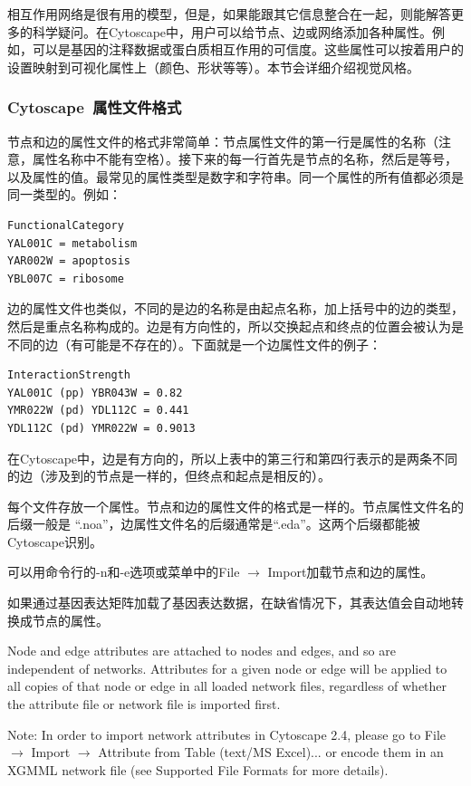 相互作用网络是很有用的模型，但是，如果能跟其它信息整合在一起，则能解答更多的科学疑问。在Cytoscape中，用户可以给节点、边或网络添加各种属性。例如，可以是基因的注释数据或蛋白质相互作用的可信度。这些属性可以按着用户的设置映射到可视化属性上（颜色、形状等等）。本节会详细介绍视觉风格。

\subsubsection{Cytoscape~属性文件格式}
节点和边的属性文件的格式非常简单：节点属性文件的第一行是属性的名称（注意，属性名称中不能有空格）。接下来的每一行首先是节点的名称，然后是等号，以及属性的值。最常见的属性类型是数字和字符串。同一个属性的所有值都必须是同一类型的。例如：

 \begin{verbatim}
FunctionalCategory
YAL001C = metabolism
YAR002W = apoptosis
YBL007C = ribosome
\end{verbatim}

边的属性文件也类似，不同的是边的名称是由起点名称，加上括号中的边的类型，然后是重点名称构成的。边是有方向性的，所以交换起点和终点的位置会被认为是不同的边（有可能是不存在的）。下面就是一个边属性文件的例子：

 \begin{verbatim}
InteractionStrength
YAL001C (pp) YBR043W = 0.82
YMR022W (pd) YDL112C = 0.441
YDL112C (pd) YMR022W = 0.9013
\end{verbatim}

在Cytoscape中，边是有方向的，所以上表中的第三行和第四行表示的是两条不同的边（涉及到的节点是一样的，但终点和起点是相反的）。

每个文件存放一个属性。节点和边的属性文件的格式是一样的。节点属性文件名的后缀一般是
``.noa''，边属性文件名的后缀通常是``.eda''。这两个后缀都能被Cytoscape识别。

可以用命令行的-n和-e选项或菜单中的File $\rightarrow$ Import加载节点和边的属性。

如果通过基因表达矩阵加载了基因表达数据，在缺省情况下，其表达值会自动地转换成节点的属性。

 Node and edge attributes are attached to nodes and edges, and so are
independent of networks. Attributes for a given node or edge will be applied to
all copies of that node or edge in all loaded network files, regardless of
whether the attribute file or network file is imported first. 

 Note: In order to import network attributes in Cytoscape 2.4, please go to
File $\rightarrow$ Import $\rightarrow$ Attribute from Table (text/MS Excel)...
or encode them in an XGMML network file (see Supported File Formats for more
details). 

